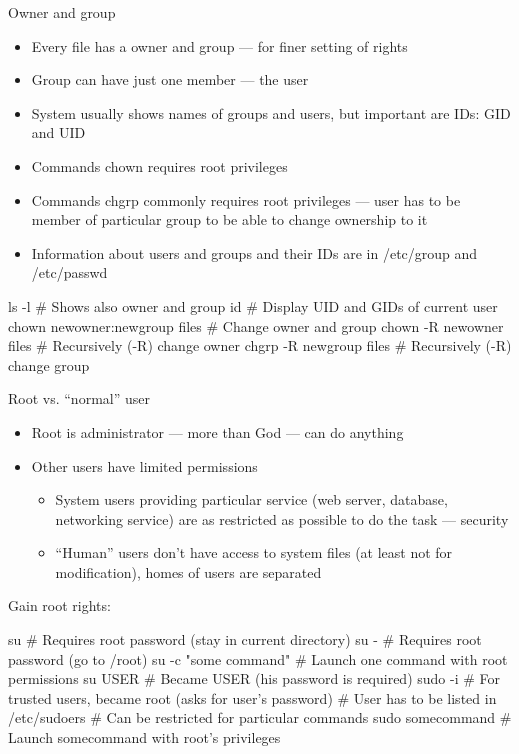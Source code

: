 \documentclass[hyperref={bookmarks=true, unicode=true, colorlinks=true, pdftitle={Linux, command line and MetaCentrum}, plainpages=false, pdfauthor={Vojtech Zeisek}, pdfsubject={Course about use of Linux command line, writing shell scripts and using MetaCentrum of CESNET}, pdfcreator={XeLaTeX, http://www.xelatex.org/}, pdfkeywords={Linux, GNU, BASH, shell, command line, MetaCentrum}, linkcolor=Sienna, anchorcolor=black, citecolor=green, filecolor=magenta, menucolor=Sienna, urlcolor=cyan, pdftex}, compress, ucs, xelatex, xcolor=svgnames, 11pt]{beamer}
\begin{document}
\begin{frame}[fragile]{Owner and group}
\begin{itemize}
  \item Every file has a owner and group --- for finer setting of rights
  \item Group can have just one member --- the user
  \item System usually shows names of groups and users, but important are IDs: GID and UID
  \item Commands chown requires root privileges
  \item Commands chgrp commonly requires root privileges --- user has to be member of particular group to be able to change ownership to it
  \item Information about users and groups and their IDs are in /etc/group and /etc/passwd
\end{itemize}
  \begin{bashcode}
    ls -l # Shows also owner and group
    id # Display UID and GIDs of current user
    chown newowner:newgroup files # Change owner and group
    chown -R newowner files # Recursively (-R) change owner
    chgrp -R newgroup files # Recursively (-R) change group
  \end{bashcode}
\end{frame}

\begin{frame}[fragile]{Root vs. ``normal'' user}
\begin{itemize}
  \item Root is administrator --- more than God --- can do anything
  \item Other users have limited permissions
  \begin{itemize}
    \item System users providing particular service (web server, database, networking service) are as restricted as possible to do the task --- security
    \item ``Human'' users don't have access to system files (at least not for modification), homes of users are separated
  \end{itemize}
\end{itemize}
Gain root rights:
  \begin{bashcode}
    su # Requires root password (stay in current directory)
    su - # Requires root password (go to /root)
    su -c "some command" # Launch one command with root permissions
    su USER # Became USER (his password is required)
    sudo -i # For trusted users, became root (asks for user's password)
            # User has to be listed in /etc/sudoers
            # Can be restricted for particular commands
    sudo somecommand # Launch somecommand with root's privileges
  \end{bashcode}
\end{frame}
\end{document}
